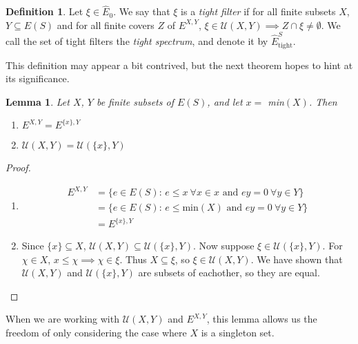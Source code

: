 \documentclass{article}
\newtheorem{lemma}[theorem]{Lemma}
\theoremstyle{definition}
\newtheorem{definition}[theorem]{Definition}
\begin{document}
\begin{definition} 
    Let $\xi \in \hat{E}_0$. We say that $\xi$ is a \textit{tight filter} if for all finite subsets $X$, $Y \subseteq E(S)$
    and for all finite covers $Z$ of $E^{X, Y}$, $\xi \in \mathcal{U}(X, Y) \implies Z \cap \xi \neq \emptyset$. We call
    the set of tight filters the \textit{tight spectrum}, and denote it by $\hat{E}_{\text{tight}}^S$.
\end{definition}
This definition may appear a bit contrived, but the next theorem hopes to hint at its significance.

\begin{lemma} Let $X$, $Y$ be finite subsets of $E(S)$, and let $x =$ min$(X)$. Then
    \begin{enumerate}
        \item[(i)] $E^{X, Y} = E^{\{x\}, Y}$
        \item[(ii)] $\mathcal{U}(X, Y) = \mathcal{U}(\{x\}, Y)$
    \end{enumerate}
\end{lemma}
\begin{proof}
    \begin{enumerate}
        \item[(i)] 
            \begin{align*}
                E^{X, Y} &= \{ e \in E(S)\text{: } e \leq x \ \forall x \in x \text{ and } ey = 0 \ \forall y \in Y \} \\
                         &= \{ e \in E(S)\text{: } e \leq \text{min}(X) \text{ and } ey = 0 \ \forall y \in Y \} \\
                         &= E^{\{x\}, Y}
            \end{align*}
        \item[(ii)]
            Since $\{x\} \subseteq X$, $\mathcal{U}(X, Y) \subseteq \mathcal{U}(\{x\}, Y)$. Now suppose $\xi \in \mathcal{U}(\{x\}, Y)$.
            For $\chi \in X$, $x \leq \chi \implies \chi \in \xi$. Thus $X \subseteq \xi$, so $\xi \in \mathcal{U}(X, Y)$. We have
            shown that $\mathcal{U}(X, Y)$ and $\mathcal{U}(\{x\}, Y)$ are subsets of eachother, so they are equal.
    \end{enumerate}
\end{proof}
When we are working with $\mathcal{U}(X, Y)$ and $E^{X, Y}$, this lemma allows us the freedom of only considering the case
where $X$ is a singleton set.
\end{document}
